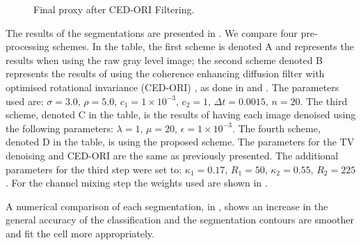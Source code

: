 \begin{figure}[!h]
	\centering
	\caption{Final proxy after CED-ORI Filtering.}
	\label{fig:cedori}
\end{figure}

\begin{definition}
	The results of the segmentations are presented in . We compare four pre-processing schemes. In the table, the first scheme is denoted A and represents the results when using the raw gray level image; the  second scheme denoted B represents the results of using the coherence enhancing diffusion filter with optimised rotational invariance (CED-ORI) \citep{Weickert2002}, as done in \citep{Maska2013} and \citep{Kroon2009}. The parameters used are:
	$\sigma = 3.0, \, \rho = 5.0, \, c_1 = 1 \times 10^{-3}, \, c_2 = 1, \, \Delta t = 0.0015, \, n=20$.
	The third scheme, denoted  C in the table, is the results of having each image denoised using the following parameters: $\lambda = 1, \, \mu = 20,  \, \epsilon = 1 \times 10^{-3}$.
	The fourth scheme, denoted D in the table, is using the proposed scheme. The parameters for the TV denoising and CED-ORI are the same as previously presented. The additional parameters for the third step were set to: $\kappa_1 = 0.17, \, R_1 = 50, \, \kappa_2 = 0.55, \, R_2 = 225$. For the channel mixing step the weights used are shown in .
	
	A numerical comparison of each segmentation, in , shows an increase in the general accuracy of the classification and the segmentation contours are smoother and fit the cell more appropriately.
	
	\begin{figure}[!h]
		\centering
		
		

\end{figure}
\end{definition}
